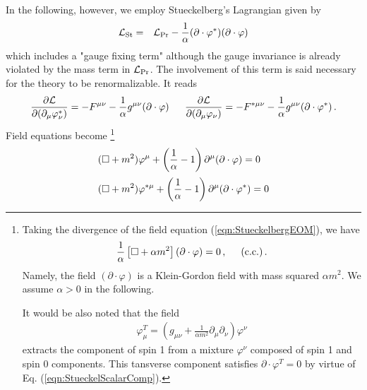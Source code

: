 In the following, however, we employ Stueckelberg's Lagrangian given by
\begin{eqnarray}
\mathcal{L}_{\mbox{\scriptsize St}}
&=&
\mathcal{L}_{\mbox{\scriptsize Pr}}
- \frac{1}{\alpha}
(\partial \cdot \varphi^*)
(\partial \cdot \varphi)
\end{eqnarray}
which includes a "gauge fixing term"
although the gauge invariance is already violated by 
the mass term in $\mathcal{L}_{\mbox{\scriptsize Pr}}$.
The involvement of this term is said \cite{ref:Hioki} necessary
for the theory to be renormalizable.
It reads
\begin{eqnarray}
\frac{\partial \mathcal{L}}
{\partial (\partial_\mu \varphi_\nu^*)}
=
-F^{\mu \nu}
- \frac{1}{\alpha}g^{\mu \nu}
(\partial\cdot \varphi)
\,
\hspace{5mm}
\frac{\partial \mathcal{L}}
{\partial (\partial_\mu \varphi_\nu)}
=
-F^{*\mu \nu}
- \frac{1}{\alpha}g^{\mu \nu}
(\partial\cdot \varphi^*)
\,.
\nonumber\\
\label{eqn:StueckelbergConjExpress}
\end{eqnarray}
Field equations become
\footnote{%
Taking the divergence of the field equation (\ref{eqn:StueckelbergEOM}), we have
\begin{eqnarray}
\frac{1}{\alpha}
\left[
\square + \alpha m^2
\right]
(\partial\cdot \varphi)
= 0
\,,
\hspace{5mm}
\mbox{(c.c.)}
\,.
\label{eqn:StueckelScalarComp}
\end{eqnarray}
Namely, the field $(\partial\cdot \varphi)$ is a Klein-Gordon field
with mass squared $\alpha m^2$.
We assume $\alpha > 0$ in the following.

It would be also noted that the field
\begin{eqnarray}
\varphi^T_\mu =
\left(
g_{\mu \nu}
+
\frac{1}{\alpha m^2}\partial_\mu \partial_\nu
\right)
\varphi^\nu
\end{eqnarray}
extracts the component of spin 1 from a mixture $\varphi^\nu$
composed of spin 1 and spin 0 components. This tansverse
component satisfies $\partial \cdot \varphi^T = 0$ by virtue of
Eq. (\ref{eqn:StueckelScalarComp}).
}%
\begin{eqnarray}
\begin{array}{l}
\displaystyle
(\square + m^2) \varphi^\mu
+
\left(
\frac{1}{\alpha} -1 
\right)
\partial^\mu
(\partial \cdot \varphi)
=
0
\vspace{2mm}
\\
\displaystyle
(\square + m^2) \varphi^{*\mu}
+
\left(
\frac{1}{\alpha} -1 
\right)
\partial^\mu
(\partial \cdot \varphi^*)
=
0
\end{array}
\label{eqn:StueckelbergEOM}
\end{eqnarray}
